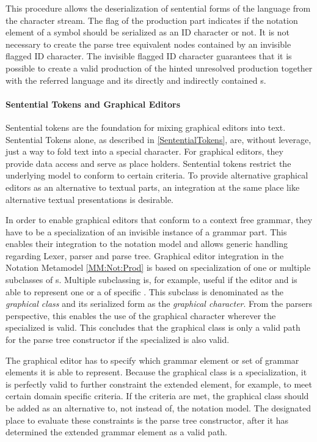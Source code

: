 This procedure allows the deserialization of sentential forms of the language from the character stream. The  flag of the production part indicates if the notation element of a symbol should be serialized as an ID character or not. It is not necessary to create the parse tree equivalent nodes contained by an invisible flagged ID character. The invisible flagged ID character guarantees that it is possible to create a valid production of the hinted unresolved production together with the referred language  and its directly and indirectly contained s.

\paragraph{Sentential Tokens and Graphical Editors}
Sentential tokens are the foundation for mixing graphical editors into text. Sentential Tokens alone, as described in \ref{SententialTokens}, are, without leverage, just a way to fold text into a special character.  For graphical editors, they provide data access and serve as place holders. Sentential tokens restrict the underlying model to conform to certain criteria. To provide alternative graphical editors as an alternative to textual parts, an integration at the same place like alternative textual presentations is desirable.

In order to enable graphical editors that conform to a context free grammar, they have to be a specialization of an invisible instance of a grammar part. This enables their integration to the notation model and allows generic handling regarding Lexer, parser and parse tree. Graphical editor integration in the Notation Metamodel \ref{MM:Not:Prod} is based on specialization of one or multiple subclasses of s. Multiple subclassing is, for example, useful if the editor and is able to represent one or a  of specific . This subclass is denominated as the \emph{graphical class} and its serialized form as the \emph{graphical character}. From the parsers perspective, this enables the use of the graphical character wherever the specialized  is valid. This concludes that the graphical class is only a valid path for the parse tree constructor if the specialized  is also valid. 

The graphical editor has to specify which grammar element or set of grammar elements it is able to represent. Because the graphical class is a specialization, it is perfectly valid to further constraint the extended element, for example, to meet certain domain specific criteria. If the criteria are met, the graphical class should be added as an alternative to, not instead of, the notation model. The designated place to evaluate these constraints is the parse tree constructor, after it has determined the extended grammar element as a valid path. 

